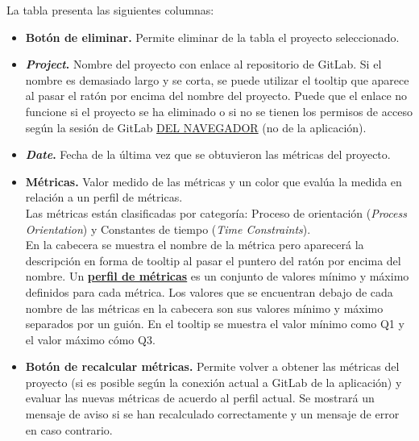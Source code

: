 La tabla presenta las siguientes columnas:
\begin{itemize}
	\item \textbf{Botón de eliminar.} Permite eliminar de la tabla el proyecto seleccionado.
	
	\item \textbf{\textit{Project}.} Nombre del proyecto con enlace al repositorio de GitLab. Si el nombre es demasiado largo y se corta, se puede utilizar el tooltip que aparece al pasar el ratón por encima del nombre del proyecto. Puede que el enlace no funcione si el proyecto se ha eliminado o si no se tienen los permisos de acceso según la sesión de GitLab \underline{DEL NAVEGADOR} (no de la aplicación).
	
	\item \textbf{\textit{Date}.} Fecha de la última vez que se obtuvieron las métricas del proyecto.
	
	\item \textbf{Métricas.} Valor medido de las métricas y un color que evalúa la medida en relación a un perfil de métricas.\\
	Las métricas están clasificadas por categoría: Proceso de orientación (\textit{Process Orientation}) y Constantes de tiempo (\textit{Time Constraints}).\\
	En la cabecera se muestra el nombre de la métrica pero aparecerá la descripción en forma de tooltip al pasar el puntero del ratón por encima del nombre.
	Un \textbf{\underline{perfil de métricas}} es un conjunto de valores mínimo y máximo definidos para cada métrica. Los valores que se encuentran debajo de cada nombre de las métricas en la cabecera son sus valores mínimo y máximo separados por un guión. En el tooltip se muestra el valor mínimo como Q1 y el valor máximo cómo Q3.
	
	\item \textbf{Botón de recalcular métricas.} Permite volver a obtener las métricas del proyecto (si es posible según la conexión actual a GitLab de la aplicación) y evaluar las nuevas métricas de acuerdo al perfil actual. Se mostrará un mensaje de aviso si se han recalculado correctamente y un mensaje de error en caso contrario.
\end{itemize}


